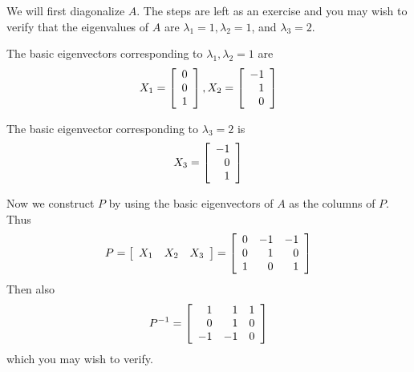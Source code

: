 \begin{solution}
We will first diagonalize $A$. The steps are left as an exercise and
you may wish to verify that the eigenvalues of $A$ are $\lambda_1 =1,
\lambda_2=1$, and $\lambda_3=2$.

The basic eigenvectors corresponding to $\lambda_1, \lambda_2 = 1$ are
\begin{equation*}
X_1 = \left[
\begin{array}{r}
0 \\
0 \\
1
\end{array}
\right] ,
X_2
=
\left[
\begin{array}{r}
-1 \\
1 \\
0
\end{array}
\right]
\end{equation*}

The basic eigenvector corresponding to $\lambda_3 = 2$ is
\begin{equation*}
X_3
=
\left[
\begin{array}{r}
-1 \\
0 \\
1
\end{array}
\right] 
\end{equation*}

Now we construct $P$ by using the basic eigenvectors of $A$ as the columns of $P$.
Thus
\begin{equation*}
P=
\left[
\begin{array}{rrr}
X_1 & X_2 & X_3
\end{array}
\right]
=
\left[
\begin{array}{rrr}
0 & -1 & -1 \\
0 & 1 & 0 \\
1 & 0 & 1
\end{array}
\right]
\end{equation*}
Then also
\begin{equation*}
P^{-1}=\left[
\begin{array}{rrr}
1 & 1 & 1 \\
0 & 1 & 0 \\
-1 & -1 & 0
\end{array}
\right]
\end{equation*}
which you may wish to verify.


\end{solution}
